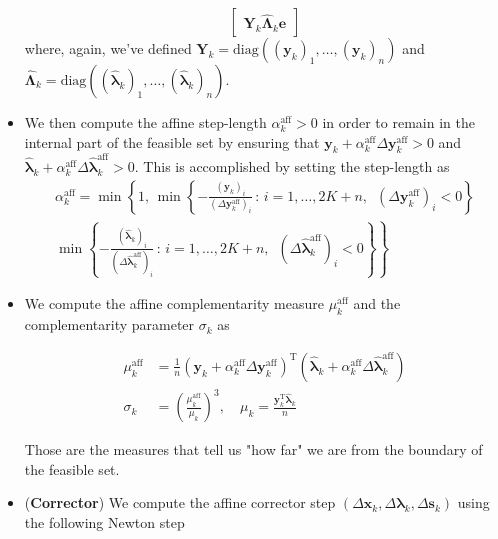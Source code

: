 \begin{itemize}
\begin{equation}
\begin{bmatrix}
            \mathbf{Y}_k\hat{\mathbf{\Lambda}}_k\bm{e}
        \end{bmatrix}
    \end{equation}
    where, again, we've defined $\mathbf{Y}_k = \mathrm{diag}\left( (\bm{y}_k)_1, \dots, (\bm{y}_k)_n\right)$ and $\hat{\mathbf{\Lambda}}_k = \mathrm{diag}( (\hat{\bm{\lambda}}_k)_1, \dots, (\hat{\bm{\lambda}}_k)_n)$.
    \item We then compute the affine step-length $\alpha_{k}^\mathrm{aff}>0$ in order to remain in the internal part of the feasible set by ensuring that $\bm{y}_k + \alpha_{k}^\mathrm{aff}\Delta\bm{y}_k^\mathrm{aff}>0$ and $\hat{\bm{\lambda}}_k + \alpha_{k}^\mathrm{aff}\Delta\hat{\bm{\lambda}}_k^\mathrm{aff}>0$. This is accomplished by setting the step-length as
    \begin{align}
        \alpha_{k}^\mathrm{aff} = \min\left\{ 1, \, \min\left\{ -\frac{(\bm{y}_k)_i}{(\Delta\bm{y}_k^\mathrm{aff})_i} \, : \, i =1, \dots, 2K + n,\,\,\, (\Delta\bm{y}_k^\mathrm{aff})_i < 0\right\}\right.\nonumber\\
        \min\left.\left\{ -\frac{(\hat{\bm{\lambda}}_k)_i}{(\Delta\hat{\bm{\lambda}}_k^\mathrm{aff})_i} \, : \,  i =1, \dots, 2K + n,\,\,\, (\Delta\hat{\bm{\lambda}}_k^\mathrm{aff})_i < 0\right\}    \right\}
    \end{align}
    \item We compute the affine complementarity measure $\mu_{k}^\mathrm{aff}$ and the complementarity parameter $\sigma_k$ as
    \begin{linenomath}
        \begin{align}
            \mu_{k}^\mathrm{aff} &= \frac{1}{n}\left(\bm{y}_k + \alpha_{k}^\mathrm{aff}\Delta\bm{y}_k^\mathrm{aff} \right)^\mathrm{T}\left(\hat{\bm{\lambda}}_k + \alpha_{k}^\mathrm{aff}\Delta\hat{\bm{\lambda}}_k^\mathrm{aff} \right)\\
            \sigma_k &= \left(\frac{\mu_{k}^\mathrm{aff}}{\mu_k}\right)^3,\quad\mu_k = \frac{\bm{y}_k^\mathrm{T}\hat{\bm{\lambda}}_k}{n}
        \end{align}
    \end{linenomath}
    Those are the measures that tell us "how far" we are from the boundary of the feasible set.
    \item (\textbf{Corrector}) We compute the affine corrector step $(\Delta\bm{x}_k, \Delta\bm{\lambda}_k,\Delta\bm{s}_k)$ using the following Newton step

\end{itemize}
